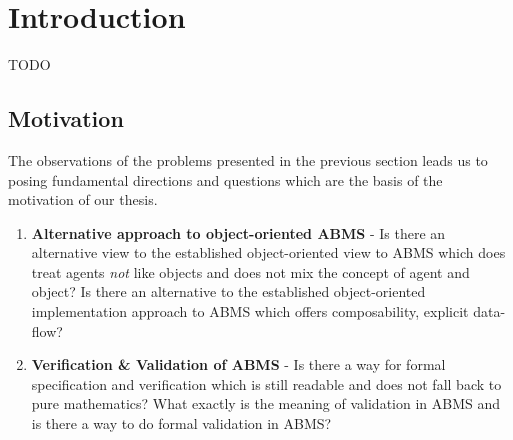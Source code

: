 \chapter{Introduction}
\label{chap:intro}

TODO

\section{Motivation}
The observations of the problems presented in the previous section leads us to posing fundamental directions and questions which are the basis of the motivation of our thesis.

\begin{enumerate}
	\item \textbf{Alternative approach to object-oriented ABMS} - Is there an alternative view to the established object-oriented view to ABMS which does treat agents \textit{not} like objects and does not mix the concept of agent and object? Is there an alternative to the established object-oriented implementation approach to ABMS which offers composability, explicit data-flow?
	\item \textbf{Verification \& Validation of ABMS} - Is there a way for formal specification and verification which is still readable and does not fall back to pure mathematics? What exactly is the meaning of validation in ABMS and is there a way to do formal validation in ABMS? 
\end{enumerate}